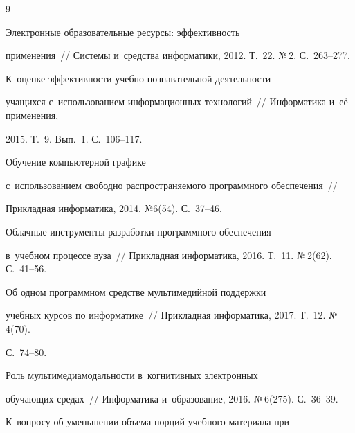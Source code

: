  {\small\frenchspacing


{%




\begin{thebibliography}{9}




 Электронные образовательные ресурсы: эффективность 


применения~/\!\!/ Системы и~средства информатики, 2012. Т.~22. №\,2. С.~263--277.




 К~оценке эффективности учебно-познавательной деятельности 


учащихся с~использованием информационных технологий~/\!\!/ Информатика и~её применения, 


2015. Т.~9. Вып.~1. С.~106--117.







 Обучение компьютерной графике 


с~использованием свободно распространяемого программного обеспечения~/\!\!/ 


Прикладная информатика, 2014. №6(54). С.~37--46.







 Облачные инструменты разработки программного обеспечения 


в~учебном процессе вуза~/\!\!/ Прикладная информатика, 2016. Т.~11. №\,2(62). С.~41--56.




 Об одном программном средстве мультимедийной поддержки 


учебных курсов по информатике~/\!\!/ Прикладная информатика, 2017. Т.~12. №\,4(70).  


С.~74--80.




 Роль мультимедиамодальности в~когнитивных электронных 


обуча\-ющих средах~/\!\!/ Информатика и~образование, 2016. №\,6(275). С.~36--39.




 К~вопросу об уменьшении объема порций учебного материала при 



\end{thebibliography}}}
